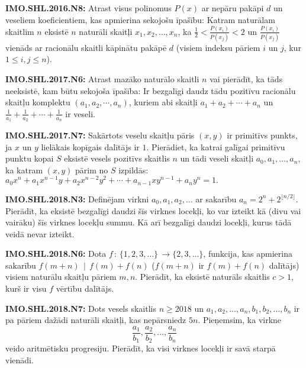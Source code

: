 \documentclass[11pt]{article}
\newenvironment{uzdevums}[1][\unskip]{%
\vspace{3mm}
\noindent
\textbf{#1:}
\noindent}
{}
\begin{document}
{\begin{uzdevums}[IMO.SHL.2016.N8]
Atrast visus polinomus $P(x)$ ar nepāru pakāpi $d$ un 
veseliem koeficientiem, kas apmierina sekojošu īpašību: 
Katram naturālam skaitlim $n$ eksistē $n$ naturāli 
skaitļi $x_1,x_2,\ldots,x_n$, ka 
${\displaystyle \frac{1}{2} < \frac{P(x_i)}{P(x_j)} < 2}$ 
un ${\displaystyle \frac{P(x_i)}{P(x_j)}}$
vienāds ar racionālu skaitli kāpinātu pakāpē $d$ 
(visiem indeksu pāriem $i$ un $j$, kur $1 \leq i,j \leq n$). 
\end{uzdevums}


\begin{uzdevums}[IMO.SHL.2017.N6]
Atrast mazāko naturālo skaitli $n$ vai pierādīt, ka tāds neeksistē, 
kam būtu sekojoša īpašība: Ir bezgalīgi daudz tādu 
pozitīvu racionālu skaitļu komplektu 
$(a_1,a_2,\cdots,a_n)$, kuriem abi skaitļi
$a_1 + a_2 + \cdots + a_n$ un
$\frac{1}{a_1} + \frac{1}{a_2} + \cdots + \frac{1}{a_n}$
ir veseli.
\end{uzdevums}

\begin{uzdevums}[IMO.SHL.2017.N7]
Sakārtots veselu skaitļu pāris $(x, y)$ ir primitīvs punkts, 
ja $x$ un $y$ lielākais kopīgais
dalītājs ir $1$. Pierādiet, ka katrai galīgai primitīvu 
punktu kopai $S$ eksistē vesels pozitīvs skaitlis
$n$ un tādi veseli skaitļi $a_0,a_1,\ldots,a_n$, 
ka katram $(x, y)$ pārim no $S$ izpildās:\\
$a_0x^n + a_1x^{n-1}y + a_2x^{n-2}y^2 + 
\cdots + a_{n-1}xy^{n-1} + a_n y^n = 1.$
\end{uzdevums}


\begin{uzdevums}[IMO.SHL.2018.N3]
Definējam virkni $a_0, a_1, a_2,\ldots$
ar sakarību $a_n = 2^n + 2^{\lfloor n/2 \rfloor}$. 
Pierādīt, ka eksistē bezgalīgi daudzi šīs virknes locekļi, 
ko var izteikt kā (divu vai vairāku) šīs virknes 
locekļu summu. Kā arī bezgalīgi daudzi locekļi, 
kurus tādā veidā nevar izteikt.
\end{uzdevums}


\begin{uzdevums}[IMO.SHL.2018.N6]
Dota $f\,:\,\{1,2,3,\ldots\}\,\rightarrow\{2,3,\ldots\}$, 
funkcija, kas apmierina sakarību
$f(m+n)\,\mid\,f(m)+f(n)$ ($f(m+n)$ ir $f(m)+f(n)$ dalītājs)
visiem naturālu skaitļu pāriem $m,n$. Pierādīt, ka 
eksistē naturāls skaitlis $c>1$, kurš ir visu 
$f$ vērtību dalītājs.
\end{uzdevums}

\begin{uzdevums}[IMO.SHL.2018.N7]
Dots vesels skaitlis $n \geq 2018$ un 
$a_1,a_2,\ldots,a_n,b_1,b_2,\ldots,b_n$
ir pa pāriem dažādi naturāli skaitļi, kas 
nepārsniedz $5n$. Pieņemsim, ka virkne
$$\frac{a_1}{b_1},\frac{a_2}{b_2},\ldots,\frac{a_n}{b_n}$$
veido aritmētisku progresiju. Pierādīt, ka visi virknes locekļi 
ir savā starpā vienādi.
\end{uzdevums}
}
\end{document}
